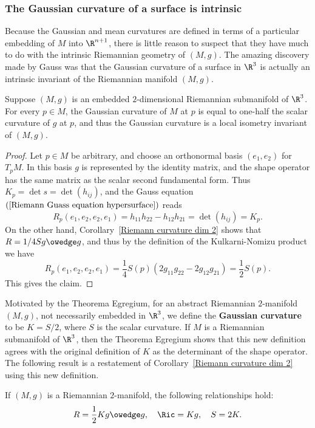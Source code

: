 \subsubsection{The Gaussian curvature of a surface is intrinsic}
Because the Gaussian and mean curvatures are defined in terms of a particular embedding of $M$ into $\R^{n+1}$, there is little reason to suspect that they have much to 
do with the intrinsic Riemannian geometry of $(M,g)$. The amazing discovery made by Gauss was that the Gaussian curvature of a surface in $\R^3$ is actually an intrinsic 
invariant of the Riemannian manifold $(M,g)$.
\begin{theorem}
Suppose $(M,g)$ is an embedded $2$-dimensional Riemannian submanifold of $\R^3$. For every $p\in M$, the Gaussian curvature of $M$ at $p$ is equal to one-half the scalar 
curvature of $g$ at $p$, and thus the Gaussian curvature is a local isometry invariant of $(M,g)$.
\end{theorem}
\begin{proof}
Let $p\in M$ be arbitrary, and choose an orthonormal basis $(e_1,e_2)$ for $T_pM$. In this basis $g$ is represented by the identity matrix, and the shape operator has the 
same matrix as the scalar second fundamental form. Thus $K_p=\det s=\det(h_{ij})$, and the Gauss equation $(\ref{Riemann Guass equation hypersurface})$ reads
\[R_p(e_1,e_2,e_2,e_1)=h_{11}h_{22}-h_{12}h_{21}=\det(h_{ij})=K_p.\]
On the other hand, Corollary~\ref{Riemann curvature dim 2} shows that $R=1/4Sg\owedge g$, and thus by the definition of the Kulkarni-Nomizu product we have
\[R_p(e_1,e_2,e_2,e_1)=\frac{1}{4}S(p)(2g_{11}g_{22}-2g_{12}g_{21})=\frac{1}{2}S(p).\]
This gives the claim.
\end{proof}
Motivated by the Theorema Egregium, for an abstract Riemannian $2$-manifold $(M,g)$, not necessarily embedded in $\R^3$, we define the \textbf{Gaussian curvature} to be 
$K=S/2$, where $S$ is the scalar curvature. If $M$ is a Riemannian submanifold of $\R^3$, then the Theorema Egregium shows that this new definition agrees with the 
original definition of $K$ as the determinant of the shape operator. The following result is a restatement of Corollary~\ref{Riemann curvature dim 2} using this new definition.
\begin{proposition}
If $(M,g)$ is a Riemannian $2$-manifold, the following relationships hold:
\[R=\frac{1}{2}Kg\owedge g,\quad \Ric=Kg,\quad S=2K.\]
\end{proposition}
